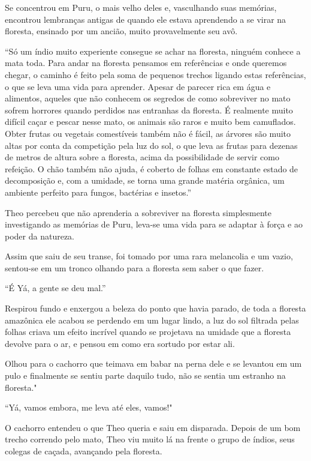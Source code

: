 Se concentrou em Puru, o mais velho deles e, vasculhando suas memórias,
encontrou lembranças antigas de quando ele estava aprendendo a se virar
na floresta, ensinado por um ancião, muito provavelmente seu avô.

``Só um índio muito experiente consegue se achar na floresta, ninguém
conhece a mata toda. Para andar na floresta pensamos em referências e
onde queremos chegar, o caminho é feito pela soma de pequenos trechos
ligando estas referências, o que se leva uma vida para aprender. Apesar
de parecer rica em água e alimentos, aqueles que não conhecem os
segredos de como sobreviver no mato sofrem horrores quando perdidos nas
entranhas da floresta. É realmente muito difícil caçar e pescar nesse
mato, os animais são raros e muito bem camuflados. Obter frutas ou
vegetais comestíveis também não é fácil, as árvores são muito altas por
conta da competição pela luz do sol, o que leva as frutas para dezenas
de metros de altura sobre a floresta, acima da possibilidade de servir
como refeição. O chão também não ajuda, é coberto de folhas em constante
estado de decomposição e, com a umidade, se torna uma grande matéria
orgânica, um ambiente perfeito para fungos, bactérias e insetos.''

Theo percebeu que não aprenderia a sobreviver na floresta simplesmente
investigando as memórias de Puru, leva-se uma vida para se adaptar à
força e ao poder da natureza.

Assim que saiu de seu transe, foi tomado por uma rara melancolia e um
vazio, sentou-se em um tronco olhando para a floresta sem saber o que
fazer.

``É Yá, a gente se deu mal.''

Respirou fundo e enxergou a beleza do ponto que havia parado, de toda a
floresta amazônica ele acabou se perdendo em um lugar lindo, a luz do
sol filtrada pelas folhas criava um efeito incrível quando se projetava
na umidade que a floresta devolve para o ar, e pensou em como era
sortudo por estar ali.

Olhou para o cachorro que teimava em babar na perna dele e se levantou
em um pulo e finalmente se sentiu parte daquilo tudo, não se sentia um
estranho na floresta."

``Yá, vamos embora, me leva até eles, vamos!"

O cachorro entendeu o que Theo queria e saiu em disparada. Depois de um
bom trecho correndo pelo mato, Theo viu muito lá na frente o grupo de
índios, seus colegas de caçada, avançando pela floresta.

